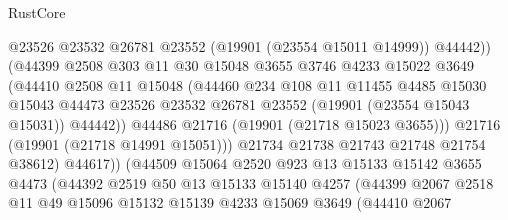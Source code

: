 \begin{lexlean}{RustCore}
\begin{coremodule}
                              @23526
                              @23532
                              @26781
                              @23552
                              (@19901 (@23554 @15011 @14999))
                              @44442))
                          (@44399
                            @2508
                            @303
                            @11
                            @30
                            @15048
                            @3655
                            @3746
                            @4233
                            @15022
                            @3649
                            (@44410
                              @2508
                              @11
                              @15048
                              (@44460
                                @234
                                @108
                                @11
                                @11455
                                @4485
                                @15030
                                @15043
                                @44473
                                @23526
                                @23532
                                @26781
                                @23552
                                (@19901 (@23554 @15043 @15031))
                                @44442))
                            @44486
                            @21716
                            (@19901 (@21718 @15023 @3655)))
                          @21716
                          (@19901 (@21718 @14991 @15051)))
                        @21734
                        @21738
                        @21743
                        @21748
                        @21754
                        @38612)
                      @44617))
                  (@44509
                    @15064
                    @2520
                    @923
                    @13
                    @15133
                    @15142
                    @3655
                    @4473
                    (@44392
                      @2519
                      @50
                      @13
                      @15133
                      @15140
                      @4257
                      (@44399
                        @2067
                        @2518
                        @11
                        @49
                        @15096
                        @15132
                        @15139
                        @4233
                        @15069
                        @3649
                        (@44410
                          @2067

\end{coremodule}
\end{lexlean}
